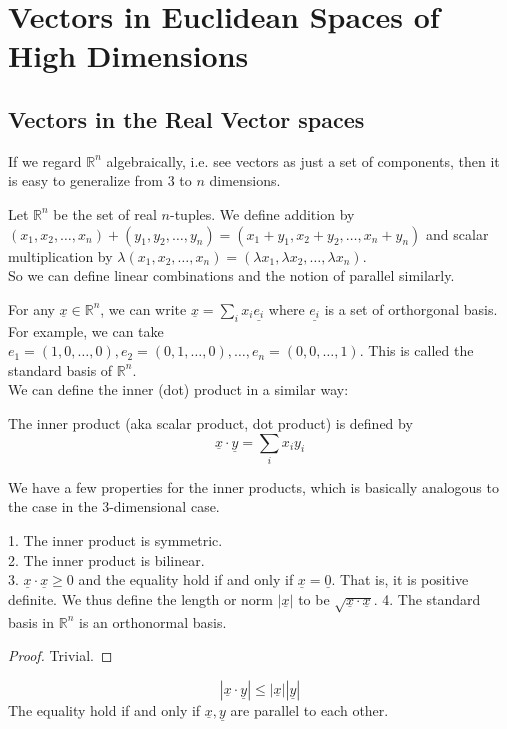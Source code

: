 \section{Vectors in Euclidean Spaces of High Dimensions}
\subsection{Vectors in the Real Vector spaces}
If we regard $\mathbb R^n$ algebraically, i.e. see vectors as just a set of components, then it is easy to generalize from $3$ to $n$ dimensions.
\begin{definition}
    Let $\mathbb R^n$ be the set of real $n$-tuples.
    We define addition by $(x_1,x_2,\ldots,x_n)+(y_1,y_2,\ldots,y_n)=(x_1+y_1,x_2+y_2,\ldots, x_n+y_n)$ and scalar multiplication by $\lambda(x_1,x_2,\ldots,x_n)=(\lambda x_1,\lambda x_2,\ldots,\lambda x_n)$.\\
    So we can define linear combinations and the notion of parallel similarly.
\end{definition}
For any $\underline{x}\in\mathbb R^n$, we can write $\underline{x}=\sum_ix_i\underline{e_i}$ where $\underline{e_i}$ is a set of orthorgonal basis.
For example, we can take $e_1=(1,0,\ldots,0), e_2=(0,1,\ldots,0), \ldots, e_n=(0,0,\ldots,1)$.
This is called the standard basis of $\mathbb R^n$.\\
We can define the inner (dot) product in a similar way:
\begin{definition}
    The inner product (aka scalar product, dot product) is defined by
    $$\underline{x}\cdot\underline{y}=\sum_ix_iy_i$$
\end{definition}
We have a few properties for the inner products, which is basically analogous to the case in the $3$-dimensional case.
\begin{proposition}
    1. The inner product is symmetric.\\
    2. The inner product is bilinear.\\
    3. $\underline{x}\cdot\underline{x}\ge 0$ and the equality hold if and only if $\underline{x}=\underline{0}$.
    That is, it is positive definite.
    We thus define the length or norm $|\underline{x}|$ to be $\sqrt{\underline{x}\cdot\underline{x}}$.
    4. The standard basis in $\mathbb R^n$ is an orthonormal basis.
\end{proposition}
\begin{proof}
    Trivial.
\end{proof}
\begin{theorem}
    $$|\underline{x}\cdot\underline{y}|\le |\underline{x}||\underline{y}|$$
    The equality hold if and only if $\underline{x},\underline{y}$ are parallel to each other.
\end{theorem}
